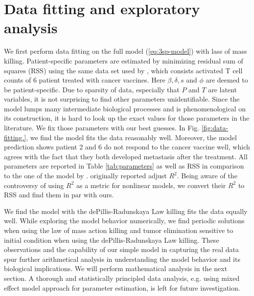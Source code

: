 \documentclass[review,authoryear]{elsarticle}
\begin{document}
\section{Data fitting and exploratory analysis} \label{sec:data}
We first perform data fitting on the full model (\ref{eq:3sp-model}) with lass of mass killing. Patient-specific parameters are estimated by minimizing residual sum of squares (RSS) using the same data set used by \cite{Messan2021}, which consists activated T cell counts of 6 patient treated with cancer vaccines. Here $\beta, \delta, s$ and $\phi$ are deemed to be patient-specific. Due to sparsity of data, especially that $P$ and $T$ are latent variables, it is not surprising to find other parameters unidentifiable.  Since the model lumps many intermediate biological processes and is phenomenological on its construction, it is hard to look up the exact values for those parameters in the literature. We fix those parameters with our best guesses. In Fig. \ref{fig:data-fitting.}, we find the model fits the data reasonably well. Moreover, the model prediction shows patient 2 and 6 do not respond to the cancer vaccine well, which agrees with the fact that they both developed metastasis after the treatment. All parameters are reported in Table \ref{tab:parameters} as well as RSS in comparison to the one of the model by \cite{Messan2021}. \cite{Messan2021} originally reported adjust $R^2$. Being aware of the controversy of using $R^2$ as a metric for nonlinear models, we convert their $R^2$ to RSS and find them  in par with ours. 

We find the model with the dePillis-Radunskaya Law killing fits the data equally well. While exploring the model behavior numerically, we find periodic solutions when using the law of mass action killing and tumor elimination sensitive to initial condition when using the dePillis-Radunskaya Law killing. These observations and the capability of our simple model in capturing the real data spur further arithmetical analysis in understanding the model behavior and its biological implications. We will perform mathematical analysis in the next section. A thorough and statistically principled data analysis, e.g. using mixed effect model approach for parameter estimation, is left for future investigation. 


     
\end{document}

